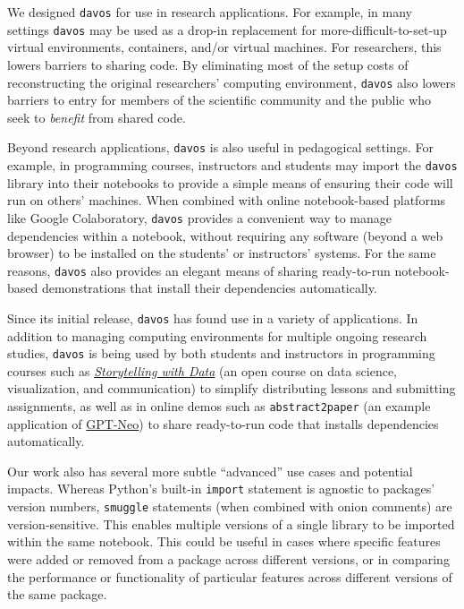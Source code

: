 \documentclass[preprint,12pt, a4paper]{elsarticle}
\begin{document}
We designed \texttt{davos} for use in research applications.  For
example, in many settings \texttt{davos} may be used as a drop-in
replacement for more-difficult-to-set-up virtual environments,
containers, and/or virtual machines.  For researchers, this lowers
barriers to sharing code.  By eliminating most of the setup costs
of reconstructing the original researchers' computing environment,
\texttt{davos} also lowers barriers to entry for members of
the scientific community and the public who seek to \textit{benefit}
from shared code.

Beyond research applications, \texttt{davos} is also useful in
pedagogical settings.  For example, in programming courses,
instructors and students may import the \texttt{davos} library into
their notebooks to provide a simple means of ensuring their code will
run on others' machines.  When combined with online notebook-based
platforms like Google Colaboratory, \texttt{davos} provides a
convenient way to manage dependencies within a notebook, without
requiring any software (beyond a web browser) to be installed on the
students' or instructors' systems.  For the same reasons,
\texttt{davos} also provides an elegant means of sharing ready-to-run
notebook-based demonstrations that install their dependencies
automatically.

Since its initial release, \texttt{davos} has found use in a variety
of applications.  In addition to managing computing environments
for multiple ongoing research studies, \texttt{davos} is being used by
both students and instructors in programming courses such as
\href{https://github.com/ContextLab/storytelling-with-data}{\textit{Storytelling
    with Data}} \cite{Mann21b} (an open course on data science,
visualization, and communication) to simplify distributing lessons and
submitting assignments, as well as in online demos such as
{\texttt{abstract2paper}} \cite{Mann21a} (an example application of
\href{https://github.com/EleutherAI/gpt-neo}{GPT-Neo}) to share
ready-to-run code that installs dependencies automatically.

Our work also has several more subtle ``advanced'' use cases and
potential impacts.  Whereas Python's built-in \texttt{import}
statement is agnostic to packages' version numbers, \texttt{smuggle}
statements (when combined with onion comments) are version-sensitive.
This enables multiple versions of a single library to be
imported within the same notebook.  This could be useful in cases
where specific features were added or removed from a package across
different versions, or in comparing the performance or functionality
of particular features across different versions of the same package.
\end{document}
